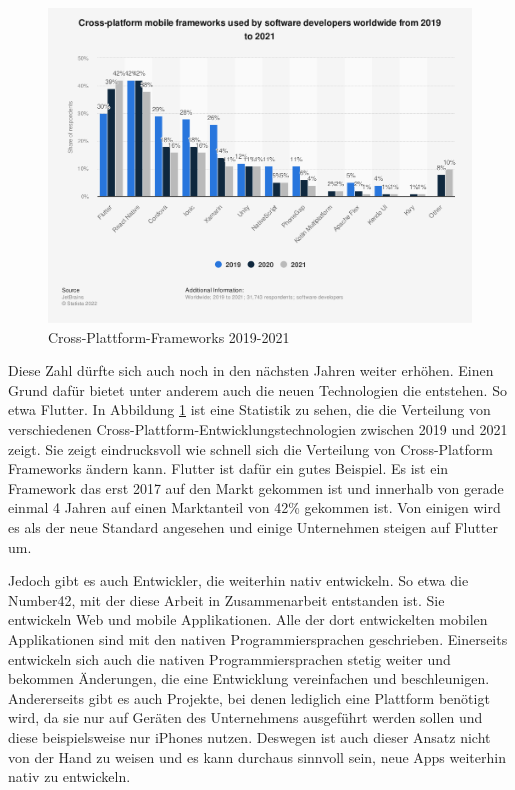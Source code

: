 \begin{figure}[ht]
  \centering
  \includegraphics[width=15cm,keepaspectratio]{images/cross-platform-mobile-frameworks.png} 
  \caption[Statistik Cross-Plattform-Frameworks]{Cross-Plattform-Frameworks 2019-2021 \cite{statist_CP_Framework}}
  \label{fig:statista_cross_plattform}
\end{figure}

Diese Zahl dürfte sich auch noch in den nächsten Jahren weiter erhöhen. Einen Grund dafür bietet unter anderem auch die neuen Technologien die entstehen. So etwa Flutter. In Abbildung \ref{fig:statista_cross_plattform} ist eine Statistik zu sehen, die die Verteilung von verschiedenen Cross-Plattform-Entwicklungstechnologien zwischen 2019 und 2021 zeigt. Sie zeigt eindrucksvoll wie schnell sich die Verteilung von Cross-Platform Frameworks ändern kann. Flutter ist dafür ein gutes Beispiel. Es ist ein Framework das erst 2017 auf den Markt gekommen ist und innerhalb von gerade einmal 4 Jahren auf einen Marktanteil von 42\% gekommen ist. Von einigen wird es als der neue Standard angesehen und einige Unternehmen steigen auf Flutter um. 

Jedoch gibt es auch Entwickler, die weiterhin nativ entwickeln. So etwa die Number42, mit der diese Arbeit in Zusammenarbeit entstanden ist. Sie entwickeln Web und mobile Applikationen. Alle der dort entwickelten mobilen Applikationen sind mit den nativen Programmiersprachen geschrieben. Einerseits entwickeln sich auch die nativen Programmiersprachen stetig weiter und bekommen Änderungen, die eine Entwicklung vereinfachen und beschleunigen. Andererseits gibt es auch Projekte, bei denen lediglich eine Plattform benötigt wird, da sie nur auf Geräten des Unternehmens ausgeführt werden sollen und diese beispielsweise nur iPhones nutzen. Deswegen ist auch dieser Ansatz nicht von der Hand zu weisen und es kann durchaus sinnvoll sein, neue Apps weiterhin nativ zu entwickeln.

